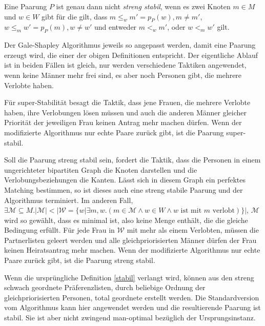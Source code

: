 \begin{Definition}
\label{streng_stabil}
  Eine Paarung $P$ ist genau dann nicht \textit{streng stabil}, wenn es zwei Knoten $m \in M$ und $w \in W$ gibt für die gilt, dass $m \leq_{w} m' = p_{P}(w), m \neq m'$, $w \leq_{m} w' = p_{P}(m), w \neq w'$ und entweder $m <_{w} m'$, oder $w <_{m} w'$ gilt.
\end{Definition}

Der Gale-Shapley Algorithmus jeweils so angepasst werden, damit eine Paarung erzeugt wird, die einer der obigen Definitionen entspricht. Der eigentliche Ablauf ist in beiden Fällen ist gleich, nur werden verschiedene Taktiken angewendet, wenn keine Männer mehr frei sind, es aber noch Personen gibt, die mehrere Verlobte haben.



Für super-Stabilität besagt die Taktik, dass jene Frauen, die mehrere Verlobte haben, ihre Verlobungen lösen müssen und auch die anderen Männer gleicher Priorität der jeweiligen Frau keinen Antrag mehr machen dürfen. Wenn der modifizierte Algorithmus nur echte Paare zurück gibt, ist die Paarung super-stabil.\par
Soll die Paarung streng stabil sein, fordert die Taktik, dass die Personen in einem ungerichteter bipartiten Graph die Knoten darstellen und die Verlobungsbeziehungen die Kanten. Lässt sich in diesem Graph ein perfektes Matching bestimmen, so ist dieses auch eine streng stabile Paarung und der Algorithmus terminiert. Im anderen Fall, $\exists \mathcal{M} \subseteq M. |\mathcal{M}| < |\mathcal{W} = \{w | \exists m, w.(m \in \mathcal{M} \land w \in W \land  w \textrm{ ist mit } m \textrm{ verlobt})\}|$, $\mathcal{M}$ wird so gewählt, dass es minimal ist, also keine Menge enthält, die die gleiche Bedingung erfüllt. Für jede Frau in $\mathcal{W}$ mit mehr als einem Verlobten, müssen die Partnerlisten geleert werden und alle gleichpriorisierten Männer dürfen der Frau keinen Heiratsantrag mehr machen.
Wenn der modifizierte Algorithmus nur echte Paare zurück gibt, ist die Paarung streng stabil.\par
Wenn die ursprüngliche Definition \ref{stabil} verlangt wird, können aus den streng schwach geordnete Präferenzlisten, durch beliebige Ordnung der gleichpriorisierten Personen, total geordnete erstellt werden. Die Standardversion vom Algorithmus kann hier angewendet werden und die resultierende Paarung ist stabil. Sie ist aber nicht zwingend man-optimal bezüglich der Ursprungsinstanz.
